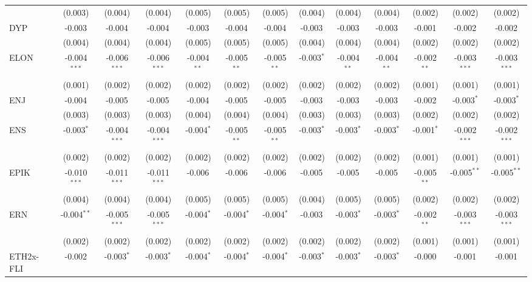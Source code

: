 \begin{table}[!htbp]
\begin{tabular}{@{\extracolsep{5pt}}lcccccccccccc}
  & (0.003) & (0.004) & (0.004) & (0.005) & (0.005) & (0.005) & (0.004) & (0.004) & (0.004) & (0.002) & (0.002) & (0.002) \\
 DYP & -0.003$^{}$ & -0.004$^{}$ & -0.004$^{}$ & -0.003$^{}$ & -0.004$^{}$ & -0.004$^{}$ & -0.003$^{}$ & -0.003$^{}$ & -0.003$^{}$ & -0.001$^{}$ & -0.002$^{}$ & -0.002$^{}$ \\
  & (0.004) & (0.004) & (0.004) & (0.005) & (0.005) & (0.005) & (0.004) & (0.004) & (0.004) & (0.002) & (0.002) & (0.002) \\
 ELON & -0.004$^{***}$ & -0.006$^{***}$ & -0.006$^{***}$ & -0.004$^{**}$ & -0.005$^{**}$ & -0.005$^{**}$ & -0.003$^{*}$ & -0.004$^{**}$ & -0.004$^{**}$ & -0.002$^{**}$ & -0.003$^{***}$ & -0.003$^{***}$ \\
  & (0.001) & (0.002) & (0.002) & (0.002) & (0.002) & (0.002) & (0.002) & (0.002) & (0.002) & (0.001) & (0.001) & (0.001) \\
 ENJ & -0.004$^{}$ & -0.005$^{}$ & -0.005$^{}$ & -0.004$^{}$ & -0.005$^{}$ & -0.005$^{}$ & -0.003$^{}$ & -0.003$^{}$ & -0.003$^{}$ & -0.002$^{}$ & -0.003$^{*}$ & -0.003$^{*}$ \\
  & (0.003) & (0.003) & (0.003) & (0.004) & (0.004) & (0.004) & (0.003) & (0.003) & (0.003) & (0.002) & (0.002) & (0.002) \\
 ENS & -0.003$^{*}$ & -0.004$^{***}$ & -0.004$^{***}$ & -0.004$^{*}$ & -0.005$^{**}$ & -0.005$^{**}$ & -0.003$^{*}$ & -0.003$^{*}$ & -0.003$^{*}$ & -0.001$^{*}$ & -0.002$^{***}$ & -0.002$^{***}$ \\
  & (0.002) & (0.002) & (0.002) & (0.002) & (0.002) & (0.002) & (0.002) & (0.002) & (0.002) & (0.001) & (0.001) & (0.001) \\
 EPIK & -0.010$^{***}$ & -0.011$^{***}$ & -0.011$^{***}$ & -0.006$^{}$ & -0.006$^{}$ & -0.006$^{}$ & -0.005$^{}$ & -0.005$^{}$ & -0.005$^{}$ & -0.005$^{**}$ & -0.005$^{**}$ & -0.005$^{**}$ \\
  & (0.004) & (0.004) & (0.004) & (0.005) & (0.005) & (0.005) & (0.004) & (0.005) & (0.005) & (0.002) & (0.002) & (0.002) \\
 ERN & -0.004$^{**}$ & -0.005$^{***}$ & -0.005$^{***}$ & -0.004$^{*}$ & -0.004$^{*}$ & -0.004$^{*}$ & -0.003$^{}$ & -0.003$^{*}$ & -0.003$^{*}$ & -0.002$^{**}$ & -0.003$^{***}$ & -0.003$^{***}$ \\
  & (0.002) & (0.002) & (0.002) & (0.002) & (0.002) & (0.002) & (0.002) & (0.002) & (0.002) & (0.001) & (0.001) & (0.001) \\
 ETH2x-FLI & -0.002$^{}$ & -0.003$^{*}$ & -0.003$^{*}$ & -0.004$^{*}$ & -0.004$^{*}$ & -0.004$^{*}$ & -0.003$^{*}$ & -0.003$^{*}$ & -0.003$^{*}$ & -0.000$^{}$ & -0.001$^{}$ & -0.001$^{}$ \\

\end{tabular}
\end{table}
